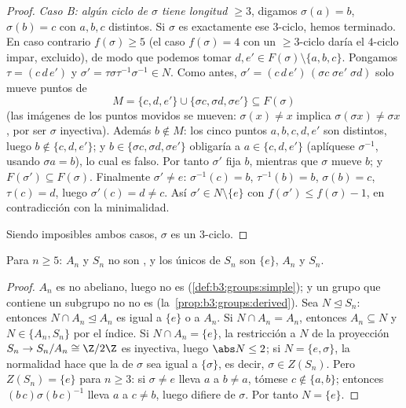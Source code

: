 \begin{proof}
\emph{Caso B: algún ciclo de $\sigma$ tiene longitud $\geq 3$}, digamos
$\sigma(a) = b$, $\sigma(b) = c$ con $a, b, c$ distintos. Si $\sigma$ es
exactamente ese $3$-ciclo, hemos terminado. En caso contrario
$f(\sigma) \geq 5$ (el caso $f(\sigma) = 4$ con un $\geq3$-ciclo daría
el $4$-ciclo impar, excluido), de modo que podemos tomar $d, e' \in
F(\sigma) \setminus \{a, b, c\}$. Pongamos $\tau = (c\,d\,e')$ y
$\sigma' = \tau\sigma\tau^{-1}\sigma^{-1} \in N$. Como antes,
$\sigma' = (c\,d\,e')\,(\sigma c\;\sigma e'\;\sigma d)$ solo mueve
puntos de
\[
M = \{c, d, e'\} \cup \{\sigma c, \sigma d, \sigma e'\}
\subseteq F(\sigma)
\]
(las imágenes de los puntos movidos se mueven: $\sigma(x) \ne x$ implica
$\sigma(\sigma x) \neq \sigma x$, por ser $\sigma$ inyectiva). Además
$b \notin M$: los cinco puntos $a, b, c, d, e'$ son distintos, luego $b
\notin \{c, d, e'\}$; y $b \in \{\sigma c, \sigma d, \sigma
e'\}$ obligaría a $a \in \{c, d, e'\}$ (aplíquese $\sigma^{-1}$, usando
$\sigma a = b$), lo cual es falso. Por tanto $\sigma'$ fija $b$,
mientras que $\sigma$ mueve $b$; y $F(\sigma') \subseteq F(\sigma)$.
Finalmente $\sigma' \neq e$:
$\sigma^{-1}(c) = b$, $\tau^{-1}(b) = b$, $\sigma(b) = c$,
$\tau(c) = d$, luego $\sigma'(c) = d \neq c$. Así $\sigma' \in N
\setminus \{e\}$ con $f(\sigma') \leq f(\sigma) - 1$, en contradicción
con la minimalidad.

Siendo imposibles ambos casos, $\sigma$ es un $3$-ciclo.
\end{proof}

\begin{corollary}\label{cor:b3:groups:snnotsolvable}
Para $n \geq 5$: $A_n$ y $S_n$ no son
, y los únicos
 de $S_n$ son $\{e\}$,
$A_n$ y $S_n$.
\end{corollary}

\begin{proof}
$A_n$ es  no abeliano, luego no es
 (\cref{def:b3:groups:simple});
y un grupo que contiene un subgrupo no
 no es 
(la~\cref{prop:b3:groups:derived}). Sea $N
\trianglelefteq S_n$: entonces $N \cap A_n \trianglelefteq A_n$ es igual
a $\{e\}$ o a $A_n$. Si $N \cap A_n = A_n$, entonces $A_n \subseteq N$ y
$N \in \{A_n, S_n\}$ por el índice. Si $N \cap A_n = \{e\}$, la
restricción a $N$ de la proyección $S_n \to S_n/A_n \cong
\Z/2\Z$ es inyectiva, luego $\abs N \leq 2$; si $N = \{e, \sigma\}$, la
normalidad hace que la  de $\sigma$ sea igual a $\{\sigma\}$, es decir,
$\sigma \in Z(S_n)$. Pero $Z(S_n) = \{e\}$ para $n \geq 3$: si
$\sigma \ne e$ lleva $a$ a $b \neq a$, tómese $c
\notin \{a, b\}$; entonces $(b\,c)\sigma(b\,c)^{-1}$ lleva $a$ a $c
\ne b$, luego difiere de $\sigma$. Por tanto $N = \{e\}$.
\end{proof}


